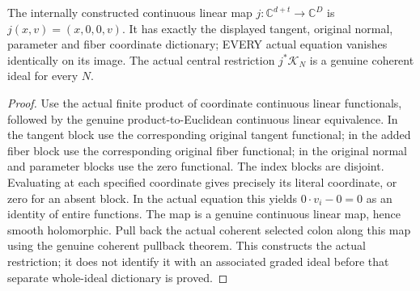 \begin{theorem}
\label{hir:relative-normal-deformation-central-restriction}
\leanok
{}
The internally constructed continuous linear map
$j:\mathbb C^{d+t}\to\mathbb C^D$ is
$j(x,v)=(x,0,0,v)$. It has exactly the displayed tangent, original normal,
parameter and fiber coordinate dictionary; EVERY actual equation vanishes
identically on its image. The actual central restriction
$j^*\mathcal K_N$ is a genuine coherent ideal for every $N$.
\end{theorem}
\begin{proof}
Use the actual finite product of coordinate continuous linear functionals,
followed by the genuine product-to-Euclidean continuous linear equivalence.
In the tangent block use the corresponding original tangent functional; in
the added fiber block use the corresponding original fiber functional; in
the original normal and parameter blocks use the zero functional. The index
blocks are disjoint. Evaluating at each specified coordinate gives precisely
its literal coordinate, or zero for an absent block. In the actual equation this yields $0\cdot v_i-0=0$
as an identity of entire functions. The map is a genuine continuous linear
map, hence smooth holomorphic. Pull back the actual coherent selected colon
along this map using the genuine coherent pullback theorem. This constructs
the actual restriction; it does not identify it with an associated graded
ideal before that separate whole-ideal dictionary is proved.
\end{proof}

